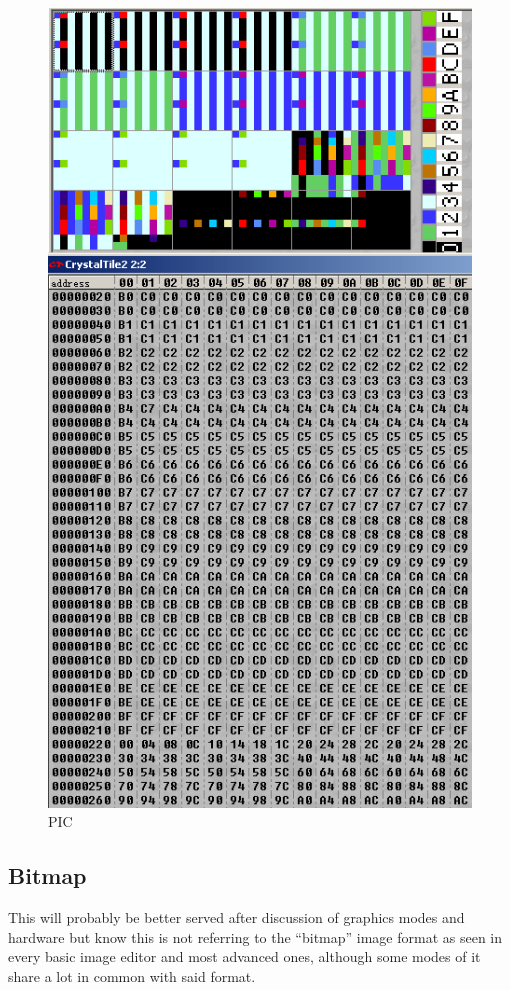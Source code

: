 \documentclass[
]{book}
\begin{document}
\begin{figure}
\centering
\includegraphics{images/25_home_fast6191_romhackingguide_unrenamed_file___original_borders_romhackingguide2dGBA24BPP1.png}
\caption{PIC}
\end{figure}

\hypertarget{bitmap}{%
\subsection{Bitmap}\label{bitmap}}

This will probably be better served after discussion of graphics modes and hardware but know this is not referring to the ``bitmap'' image format as seen in every basic image editor and most advanced ones, although some modes of it share a lot in common with said format.
\end{document}
